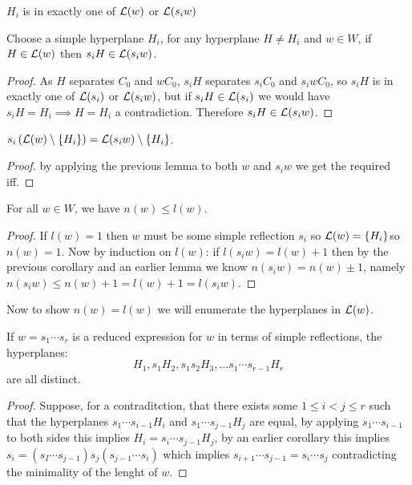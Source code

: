 \documentclass[../main.tex]{subfiles}
\begin{document}
\begin{lemma}
    $H_i$ is in exactly one of $\mathcal{L}(w)$ or $\mathcal{L}(s_i w)$
\end{lemma}

\begin{lemma}
    Choose a simple hyperplane $H_i$, for any hyperplane $H\neq H_i$ and $w\in W$, if $H\in \mathcal{L}(w)$ then $s_iH\in \mathcal{L}(s_i w)$.
    \begin{proof}
        As $H$ separates $C_0$ and $wC_0$, $s_iH$ separates $s_i C_0$ and $s_i w C_0$, so $s_i H$ is in exactly one of $\mathcal{L}(s_i)$ or $\mathcal{L}(s_i w)$, but if $s_i H \in \mathcal{L}(s_i)$ we would have $s_i H = H_i \implies H=H_i$ a contradiction. Therefore $s_i H \in \mathcal{L}(s_i w)$.
    \end{proof}
\end{lemma}

\begin{corollary}
    $s_i\left( \mathcal{L}(w)\setminus \{H_i\} \right) = \mathcal{L}(s_i w) \setminus \{H_i\}$.\begin{proof}
        by applying the previous lemma to both $w$ and $s_i w$ we get the required iff.
    \end{proof}
\end{corollary}

\begin{proposition}
    For all $w\in W$, we have $n(w)\leq l(w)$.
    \begin{proof}
        If $l(w) = 1$ then $w$ must be some simple reflection $s_i$ so $\mathcal{L}(w) = \{H_i\}$\citationneeded so $n(w)=1$. Now by induction on $l(w)$: if $l(s_i w) = l(w) + 1$ then by the previous corollary and an earlier lemma we know $n(s_i w) = n(w) \pm 1$, namely $n(s_i w) \leq n(w) + 1 = l(w) + 1 = l(s_i w)$.
    \end{proof}
\end{proposition}

Now to show $n(w)=l(w)$ we will enumerate the hyperplanes in $\mathcal{L}(w)$.

\begin{lemma}
    If $w=s_1\cdots s_r$ is a reduced expression for $w$ in terms of simple reflections, the hyperplanes:\[
        H_1, s_1 H_2, s_1s_2H_3,\ldots s_1\cdots s_{r-1} H_r
    \] are all distinct.
    \begin{proof}
        Suppose, for a contraditction, that there exists some $1\leq i < j \leq r$ such that the hyperplanes $s_1 \cdots s_{i-1} H_i$ and $s_1\cdots s_{j-1} H_j$ are equal, by applying $s_1\cdots s_{i-1}$ to both sides this implies $H_i = s_i\cdots s_{j-1}H_j$, by an earlier corollary this implies $s_i = (s_I\cdots s_{j-1})s_j(s_{j-1}\cdots s_i)$ which implies $s_{i+1}\cdots s_{j-1} = s_i\cdots s_j$ contradicting the minimality of the lenght of $w$.
    \end{proof}
\end{lemma}
\end{document}
